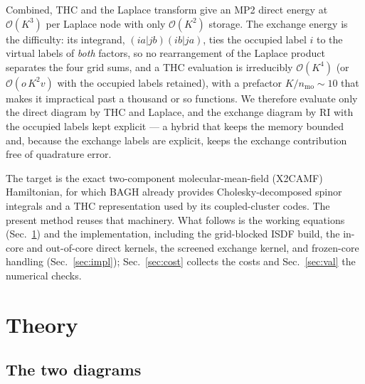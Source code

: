 \documentclass[aip,jcp,amsmath,amssymb,preprint,superscriptaddress]{revtex4-2}%
\newcommand{\Ord}[1]{\mathcal{O}\!\left(#1\right)}
\begin{document}
Combined, THC and the Laplace transform give an MP2 direct energy at
$\Ord{K^3}$ per Laplace node with only $\Ord{K^2}$ storage.\cite{Jung2004,
Song2016,Lee2020} The exchange energy is the difficulty: its integrand,
$(ia|jb)(ib|ja)$, ties the occupied label $i$ to the virtual labels of
\emph{both} factors, so no rearrangement of the Laplace product separates
the four grid sums, and a THC evaluation is irreducibly $\Ord{K^4}$ (or
$\Ord{o\,K^2 v}$ with the occupied labels retained), with a prefactor
$K/n_{\mathrm{mo}}\sim 10$ that makes it impractical past a thousand or so
functions. We therefore evaluate only the direct diagram by THC and Laplace,
and the exchange diagram by RI with the occupied labels kept explicit --- a
hybrid that keeps the memory bounded and, because the exchange labels are
explicit, keeps the exchange contribution free of quadrature error.

The target is the exact two-component molecular-mean-field (X2CAMF)
Hamiltonian,\cite{Liu2018,Zhang2022} for which BAGH already provides
Cholesky-decomposed spinor integrals and a THC representation used by its
coupled-cluster codes. The present method reuses that machinery. What
follows is the working equations (Sec.~\ref{sec:theory}) and the
implementation, including the grid-blocked ISDF build, the in-core and
out-of-core direct kernels, the screened exchange kernel, and frozen-core
handling (Sec.~\ref{sec:impl}); Sec.~\ref{sec:cost} collects the costs and
Sec.~\ref{sec:val} the numerical checks.

\section{Theory}
\label{sec:theory}

\subsection{The two diagrams}
\end{document}
